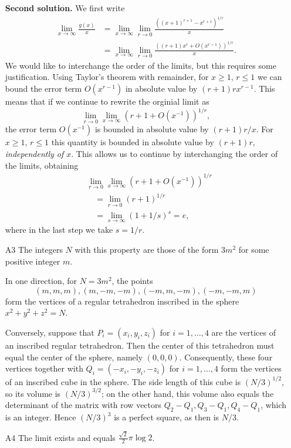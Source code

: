 \documentclass[amssymb,twocolumn,pra,10pt,aps]{revtex4-1}
\begin{document}
\begin{itemize}
\noindent
\textbf{Second solution.}
We first write 
\begin{align*}
\lim_{x \to \infty} \frac{g(x)}{x} &= \lim_{x \to \infty} \lim_{r \to 0} \frac{((x+1)^{r+1} - x^{r+1})^{1/r}}{x} \\
&= \lim_{x \to \infty} \lim_{r \to 0} \frac{((r+1) x^r + O(x^{r-1}))^{1/r}}{x}.
\end{align*}
We would like to interchange the order of the limits, but this requires some justification.
Using Taylor's theorem with remainder, for $x \geq 1$, $r \leq 1$
we can bound the error term $O(x^{r-1})$ in absolute value by $(r+1) r x^{r-1}$. This
means that if we continue to rewrite the orginial limit as
\[
\lim_{r\to 0} \lim_{x\to\infty} (r+1+O(x^{-1}))^{1/r},
\]
the error term $O(x^{-1})$ is bounded in absolute value by $(r+1) r/x$.
For $x \geq 1$, $r \leq 1$ this quantity is bounded in absolute value by $(r+1)r$, \emph{independently of $x$}. This allows us to continue by interchanging the order of the limits,
obtaining 
\begin{align*}
&\lim_{r\to 0} \lim_{x\to\infty} (r+1+O(x^{-1}))^{1/r} \\
&\quad = \lim_{r\to 0} (r+1)^{1/r} \\
&\quad = \lim_{s\to \infty} (1+1/s)^{s} = e,
\end{align*}
where in the last step we take $s = 1/r$.

\item[A3]
The integers $N$ with this property are those of the form $3m^2$ for some positive integer $m$.

In one direction, for $N = 3m^2$, the points
\[
(m,m,m), (m,-m,-m), (-m,m,-m), (-m,-m,m)
\]
form the vertices of a regular tetrahedron inscribed in the sphere $x^2 + y^2 + z^2 = N$.

Conversely, suppose that $P_i = (x_i, y_i, z_i)$ for $i=1,\dots,4$ are the vertices of an inscribed regular 
tetrahedron. Then the center of this tetrahedron must equal the center of the sphere, namely $(0,0,0)$. Consequently, these four vertices together with $Q_i = (-x_i, -y_i, -z_i)$ for $i=1,\dots,4$ form the vertices of an inscribed cube in the sphere.
The side length of this cube is $(N/3)^{1/2}$, so its volume is $(N/3)^{3/2}$;
on the other hand, this volume also equals the determinant of the matrix
with row vectors $Q_2-Q_1, Q_3-Q_1, Q_4-Q_1$, which is an integer. Hence $(N/3)^3$ is a perfect square, as then is $N/3$.

\item[A4]
The limit exists and equals $\frac{\sqrt{2}}{2} \pi \log 2$.


\end{itemize}
\end{document}
